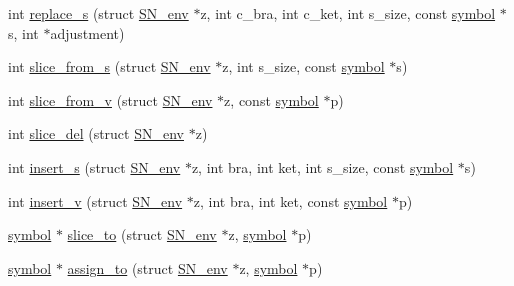 \begin{DoxyCompactItemize}
int \mbox{\hyperlink{namespaceirk_1_1porter2_a9d454cff8072863d1dc4e207c7dcd3cc}{replace\+\_\+s}} (struct \mbox{\hyperlink{structirk_1_1porter2_1_1SN__env}{S\+N\+\_\+env}} $\ast$z, int c\+\_\+bra, int c\+\_\+ket, int s\+\_\+size, const \mbox{\hyperlink{namespaceirk_1_1porter2_afd04c4eb58a1dabcf8f3ab2d7e9f9ed5}{symbol}} $\ast$s, int $\ast$adjustment)
\item 
int \mbox{\hyperlink{namespaceirk_1_1porter2_ad095cff654da2cff8bdcc3b5f84be780}{slice\+\_\+from\+\_\+s}} (struct \mbox{\hyperlink{structirk_1_1porter2_1_1SN__env}{S\+N\+\_\+env}} $\ast$z, int s\+\_\+size, const \mbox{\hyperlink{namespaceirk_1_1porter2_afd04c4eb58a1dabcf8f3ab2d7e9f9ed5}{symbol}} $\ast$s)
\item 
int \mbox{\hyperlink{namespaceirk_1_1porter2_a711127812947877f218b3b40fbded030}{slice\+\_\+from\+\_\+v}} (struct \mbox{\hyperlink{structirk_1_1porter2_1_1SN__env}{S\+N\+\_\+env}} $\ast$z, const \mbox{\hyperlink{namespaceirk_1_1porter2_afd04c4eb58a1dabcf8f3ab2d7e9f9ed5}{symbol}} $\ast$p)
\item 
int \mbox{\hyperlink{namespaceirk_1_1porter2_af6ef733e0808b8ba62d70ae7b452a396}{slice\+\_\+del}} (struct \mbox{\hyperlink{structirk_1_1porter2_1_1SN__env}{S\+N\+\_\+env}} $\ast$z)
\item 
int \mbox{\hyperlink{namespaceirk_1_1porter2_a0e0f25344d2fa321eec7e9070fafcf67}{insert\+\_\+s}} (struct \mbox{\hyperlink{structirk_1_1porter2_1_1SN__env}{S\+N\+\_\+env}} $\ast$z, int bra, int ket, int s\+\_\+size, const \mbox{\hyperlink{namespaceirk_1_1porter2_afd04c4eb58a1dabcf8f3ab2d7e9f9ed5}{symbol}} $\ast$s)
\item 
int \mbox{\hyperlink{namespaceirk_1_1porter2_a12ccbde0062a521e09ff7379edd561d7}{insert\+\_\+v}} (struct \mbox{\hyperlink{structirk_1_1porter2_1_1SN__env}{S\+N\+\_\+env}} $\ast$z, int bra, int ket, const \mbox{\hyperlink{namespaceirk_1_1porter2_afd04c4eb58a1dabcf8f3ab2d7e9f9ed5}{symbol}} $\ast$p)
\item 
\mbox{\hyperlink{namespaceirk_1_1porter2_afd04c4eb58a1dabcf8f3ab2d7e9f9ed5}{symbol}} $\ast$ \mbox{\hyperlink{namespaceirk_1_1porter2_a3d0ff0b33c6bed8d07085df31886d1b3}{slice\+\_\+to}} (struct \mbox{\hyperlink{structirk_1_1porter2_1_1SN__env}{S\+N\+\_\+env}} $\ast$z, \mbox{\hyperlink{namespaceirk_1_1porter2_afd04c4eb58a1dabcf8f3ab2d7e9f9ed5}{symbol}} $\ast$p)
\item 
\mbox{\hyperlink{namespaceirk_1_1porter2_afd04c4eb58a1dabcf8f3ab2d7e9f9ed5}{symbol}} $\ast$ \mbox{\hyperlink{namespaceirk_1_1porter2_ae7f933c4c34ac75fbcdee91cda94ee4d}{assign\+\_\+to}} (struct \mbox{\hyperlink{structirk_1_1porter2_1_1SN__env}{S\+N\+\_\+env}} $\ast$z, \mbox{\hyperlink{namespaceirk_1_1porter2_afd04c4eb58a1dabcf8f3ab2d7e9f9ed5}{symbol}} $\ast$p)

\end{DoxyCompactItemize}
